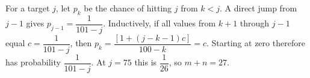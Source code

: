 For a target $j$, let $p_k$ be the chance of hitting $j$ from $k<j$. A direct jump from $j-1$ gives $p_{j-1}=\dfrac{1}{101-j}$. Inductively, if all values from $k+1$ through $j-1$ equal $c=\dfrac{1}{101-j}$, then $p_k=\dfrac{[1+(j-k-1)c]}{100-k}=c$. Starting at zero therefore has probability $\dfrac{1}{101-j}$. At $j=75$ this is $\dfrac{1}{26}$, so $\boxed{m+n=27}$.
